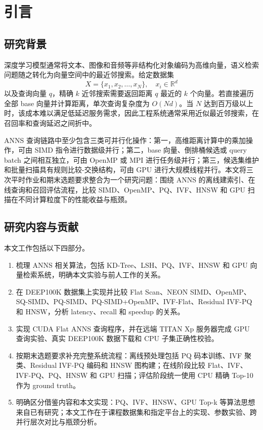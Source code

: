 \documentclass[UTF8,a4paper,10pt]{ctexart}
\begin{document}
\newpage
\tableofcontents
\newpage
\setcounter{page}{1}

\section{引言}

\subsection{研究背景}

深度学习模型通常将文本、图像和音频等非结构化对象编码为高维向量，语义检索问题随之转化为向量空间中的最近邻搜索。给定数据集
\[
X=\{x_1,x_2,\ldots,x_N\}, \quad x_i\in\mathbb{R}^d
\]
以及查询向量 $q$，精确 $k$ 近邻搜索需要返回距离 $q$ 最近的 $k$ 个向量。若直接遍历全部 base 向量并计算距离，单次查询复杂度为 $O(Nd)$。当 $N$ 达到百万级以上时，该成本难以满足低延迟服务需求，因此工程系统通常采用近似最近邻搜索，在召回率和查询延迟之间折中。

ANNS 查询链路中至少包含三类可并行化操作：第一，高维距离计算中的乘加操作，可由 SIMD 指令进行数据级并行；第二，base 向量、倒排桶候选或 query batch 之间相互独立，可由 OpenMP 或 MPI 进行任务级并行；第三，候选集维护和批量扫描具有规则比较-交换结构，可由 GPU 进行大规模线程并行。本文将三次平时作业和期末选题要求整合为一个研究问题：围绕 ANNS 的离线建索引、在线查询和召回评估流程，比较 SIMD、OpenMP、PQ、IVF、HNSW 和 GPU 扫描在不同计算粒度下的性能收益与瓶颈。

\subsection{研究内容与贡献}

本文工作包括以下四部分。

\begin{enumerate}
    \item 梳理 ANNS 相关算法，包括 KD-Tree、LSH、PQ、IVF、HNSW 和 GPU 向量检索系统，明确本文实验与前人工作的关系。
    \item 在 DEEP100K 数据集上实现并比较 Flat Scan、NEON SIMD、OpenMP、SQ-SIMD、PQ-SIMD、PQ-SIMD+OpenMP、IVF-Flat、Residual IVF-PQ 和 HNSW，分析 latency、recall 和 speedup 的关系。
    \item 实现 CUDA Flat ANNS 查询程序，并在远端 TITAN Xp 服务器完成 GPU 查询实验、真实 DEEP100K 数据下载和 CPU 子集正确性校验。
    \item 按期末选题要求补充完整系统流程：离线预处理包括 PQ 码本训练、IVF 聚类、Residual IVF-PQ 编码和 HNSW 图构建；在线阶段比较 Flat、IVF、IVF-PQ、PQ、HNSW 和 GPU 扫描；评估阶段统一使用 CPU 精确 Top-10 作为 ground truth。
    \item 明确区分借鉴内容和本文实现：PQ、IVF、HNSW、GPU Top-k 等算法思想来自已有研究；本文工作在于课程数据集和指定平台上的实现、参数实验、跨并行层次对比与瓶颈分析。
\end{enumerate}
\end{document}
